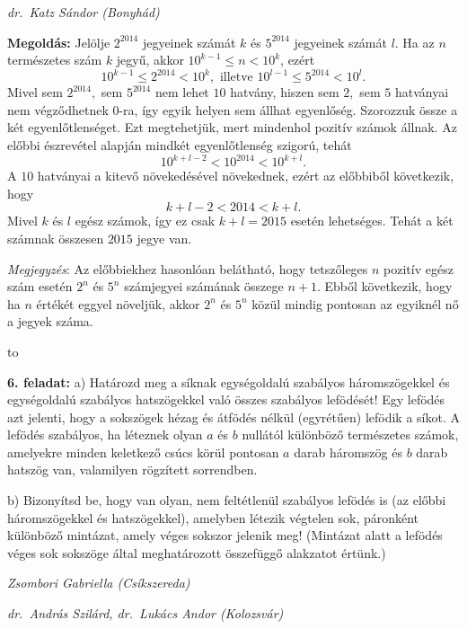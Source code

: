 \documentclass[a4paper,10pt]{article}
\newcommand{\ki}[2]{\hfill {\it #1 (#2)}\medskip}
\newcommand{\vonal}{\hbox to \hsize{\hskip2truecm\hrulefill\hskip2truecm}}
\begin{document}
\ki{dr.~Katz Sándor}{Bonyhád}\medskip

{\bf Megoldás: } Jelölje $2^{2014}$ jegyeinek szá\-mát $k$
és $5^{2014}$ jegyeinek szá\-mát $l$.  Ha az $n$
természetes szám $k$ jegyű, akkor $10^{k-1}\leq
n<10^{k}$, ezért
$$
10^{k-1}\leq2^{2014}<10^{k},%
\mbox{ illetve } 10^{l-1}\leq5^{2014}<10^{l}.%
$$
 Mivel sem $2^{2014},$ sem $5^{2014}$ nem lehet $10$ hatvány,
hiszen sem $2,$ sem $5$ hatványai nem végződhetnek
$0$-ra, így egyik helyen sem állhat egyenlőség.
Szorozzuk össze a két egyenlőtlenséget. Ezt
megtehetjük, mert mindenhol pozitív számok állnak.
Az előbbi észrevétel alapján mindkét egyenlőtlenség
szigorú, tehát
\[
10^{k+l-2}<10^{2014}<10^{k+l}.%
\]
A $10$ hatványai a kitevő növekedésével növekednek,
ezért az előbbi\-ből következik, hogy
$$k+l-2<2014<k+l.$$ Mivel $k$ és $l$ egész számok,
így ez csak $k+l=2015$ esetén lehetséges. Tehát a
két számnak összesen $2015$ jegye van.

\textit{Megjegyzés}: Az előbbiekhez hasonlóan belátható, hogy
tetszőleges $n$ pozitív egész szám esetén
$2^{n}$ és $5^{n}$ számjegyei számának összege
$n+1$. Ebből következik, hogy ha $n$ értékét
eggyel növeljük, akkor $2^{n}$ és $5^{n}$ közül
mindig pontosan az egyiknél nő a jegyek száma.


\medskip

\vonal


{\bf 6. feladat: } a) Határozd meg a síknak egységoldalú szabályos
háromszögekkel és egy\-ség\-oldalú szabályos
hatszögekkel való összes szabályos lefödését! Egy
lefödés azt jelenti, hogy a sokszögek hézag és
átfödés nélkül (egyrétűen) lefödik a síkot. A
lefödés sza\-bá\-lyos, ha léteznek olyan $a$ és $b$
nullától különböző természetes számok, amelyekre
minden keletkező csúcs körül pontosan $a$ darab
háromszög és $b$ darab hatszög van, valamilyen rögzített
sorrendben.

\smallskip
b) Bizonyítsd be, hogy van olyan, nem feltétlenül szabályos
lefödés is (az előbbi háromszögekkel és
hatszögekkel), amelyben létezik végtelen sok, páron\-ként
különböző mintázat, amely véges sokszor jelenik meg!
(Min\-tá\-zat alatt a lefödés véges sok sokszöge által
megha\-tá\-ro\-zott összefüggő alakzatot értünk.)



\ki{Zsombori Gabriella}{Csíkszereda}

\ki{dr.~András Szilárd, dr.~Lukács Andor}{Kolozsvár}
\end{document}
